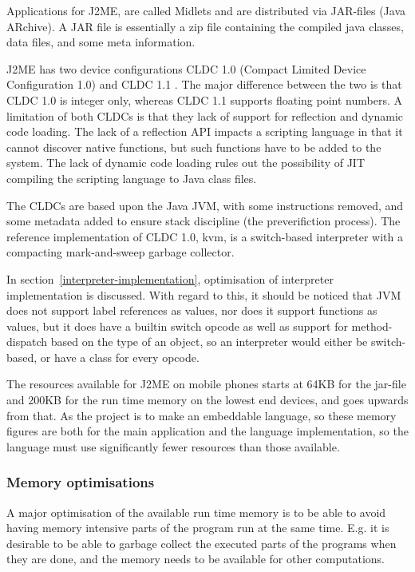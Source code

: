 Applications for J2ME, are called Midlets and are distributed via JAR-files (Java ARchive). A JAR file is essentially a zip file containing the compiled java classes, data files, and some meta information.

J2ME has two device configurations CLDC 1.0 (Compact Limited Device Configuration 1.0)\cite{cldc10}  and CLDC 1.1 \cite{cldc11}. The major difference between the two is that CLDC 1.0 is integer only, whereas CLDC 1.1 supports floating point numbers.
A limitation of both CLDCs is that they lack of support for reflection and dynamic code loading.
The lack of a reflection API impacts a scripting language in that it cannot discover native functions, but such functions have to be added to the system.
The lack of dynamic code loading rules out the possibility of JIT compiling the scripting language to Java class files.

The CLDCs are based upon the Java JVM\cite{jvmref}, with some instructions removed, and some metadata added to ensure stack discipline (the preverifiction process).
The reference implementation of CLDC 1.0, kvm, is a switch-based interpreter with a compacting mark-and-sweep garbage collector\cite{kvm,kvm-src}.

In section~\ref{interpreter-implementation}, optimisation of interpreter implementation is discussed.
With regard to this, it should be noticed that JVM does not support label references as values, nor does it support functions as values, but it does have a builtin switch opcode as well as support for method-dispatch based on the type of an object, so an interpreter would either be switch-based, or have a class for every opcode.

The resources available for J2ME on mobile phones starts at 64KB for the jar-file and 200KB for the run time memory on the lowest end devices, and goes upwards from that\cite{nokiaoptim}.
As the project is to make an embeddable language, so these memory figures are both for the main application and the language implementation, so the language must use significantly fewer resources than those available.


\subsubsection{Memory optimisations}
A major optimisation of the available run time memory is to be able to avoid having memory intensive parts of the program run at the same time. E.g. it is desirable to be able to garbage collect the executed parts of the programs when they are done, and the memory needs to be available for other computations.

